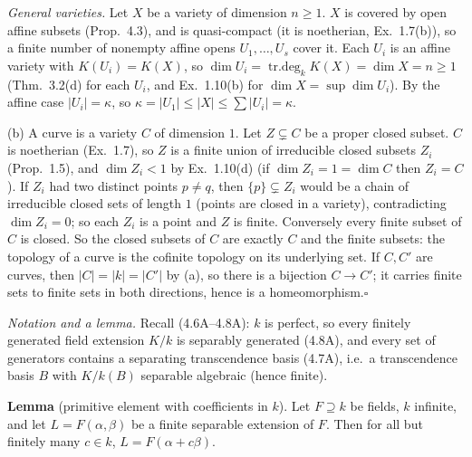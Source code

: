 \documentclass[11pt]{article}
\begin{document}
\emph{General varieties.} Let $X$ be a variety of dimension $n\ge1$. $X$ is covered by open affine subsets (Prop.~4.3), and is quasi-compact (it is noetherian, Ex.~1.7(b)), so a finite number of nonempty affine opens $U_1,\dots,U_s$ cover it. Each $U_i$ is an affine variety with $K(U_i)=K(X)$, so $\dim U_i=\operatorname{tr.deg}_kK(X)=\dim X=n\ge1$ (Thm.~3.2(d) for each $U_i$, and Ex.~1.10(b) for $\dim X=\sup\dim U_i$). By the affine case $|U_i|=\kappa$, so $\kappa=|U_1|\le|X|\le\sum|U_i|=\kappa$.

(b) A curve is a variety $C$ of dimension $1$. Let $Z\subsetneq C$ be a proper closed subset. $C$ is noetherian (Ex.~1.7), so $Z$ is a finite union of irreducible closed subsets $Z_i$ (Prop.~1.5), and $\dim Z_i<1$ by Ex.~1.10(d) (if $\dim Z_i=1=\dim C$ then $Z_i=C$). If $Z_i$ had two distinct points $p\ne q$, then $\{p\}\subsetneq Z_i$ would be a chain of irreducible closed sets of length $1$ (points are closed in a variety), contradicting $\dim Z_i=0$; so each $Z_i$ is a point and $Z$ is finite. Conversely every finite subset of $C$ is closed. So the closed subsets of $C$ are exactly $C$ and the finite subsets: the topology of a curve is the cofinite topology on its underlying set. If $C,C'$ are curves, then $|C|=|k|=|C'|$ by (a), so there is a bijection $C\to C'$; it carries finite sets to finite sets in both directions, hence is a homeomorphism.\hfill$\square$

\pf
\emph{Notation and a lemma.} Recall (4.6A--4.8A): $k$ is perfect, so every finitely generated field extension $K/k$ is separably generated (4.8A), and every set of generators contains a separating transcendence basis (4.7A), i.e.\ a transcendence basis $B$ with $K/k(B)$ separable algebraic (hence finite).

\smallskip
\textbf{Lemma} (primitive element with coefficients in $k$). Let $F\supseteq k$ be fields, $k$ infinite, and let $L=F(\alpha,\beta)$ be a finite separable extension of $F$. Then for all but finitely many $c\in k$, $L=F(\alpha+c\beta)$.
\end{document}
